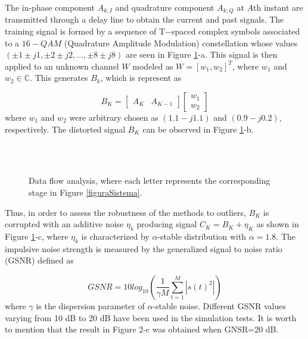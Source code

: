 \documentclass[preprint,12pt]{elsarticle}
\begin{document}
The in-phase component $A_{k;I}$ and quadrature component $A_{k;Q}$ at $A$th instant are transmitted through a delay line to obtain the current and past signals. The training signal is formed by a sequence of T$-$spaced complex symbols associated to a $16-QAM$ (Quadrature Amplitude Modulation) constellation whose values $(\pm 1 \pm j1, \pm 2 \pm j2, ... , \pm 8 \pm j8)$ are seen in Figure \ref{dataflow}-a. This signal is then applied to an unknown channel $W$ modeled as $W = [w_1,w_2]^T$, where $w_1$ and $w_2 \in \mathbb{C}$. This generates $B_k$, which is represent as

\begin{equation}
    B_{K} = \begin{bmatrix}
        A_K & A_{K-1}
     \end{bmatrix}
    \begin{bmatrix}
        w_1 \\
        w_2
    \end{bmatrix}
\end{equation}
where $w_1$ and $w_2$ were arbitrary chosen as $(1.1 - j1.1)$ and $(0.9 -j0.2)$, respectively. The distorted signal $B_K$ can be observed in Figure \ref{dataflow}-b.

\begin{figure}[H]
\centering
{} 
\\
\subfloat[$B_k$ when corrupted with alpha-stable noise $(C_k)$. Alpha = 1.8 and GSNR = 20dB.]{\texttt{[image: t4]}} 
\subfloat[Recovered signal after adaptive equalization using MCCC using kernel size $\sigma = 1$ $(D_k)$]{\texttt{[image: t5]}}\\
\caption{Data flow analysis, where each letter represents the corresponding stage in Figure \ref{figuraSistema}.} 
\label{dataflow} 
\end{figure}



Thus, in order to assess the robustness of the methods to outliers, $B_K$ is corrupted with an additive noise $\eta_k$ producing signal $C_K = B_K + \eta_K$ as shown in Figure \ref{dataflow}-c, where $\eta_k$ is characterized by $\alpha$-stable distribution with $\alpha=1.8$. The impulsive noise strength is measured by the generalized signal to noise ratio  (GSNR) \citep{medidagsnr} defined as

\begin{equation}
GSNR = 10log_{10}\left ( \frac{1}{\gamma M}\sum_{t=1}^{M}|s(t)^2| \right )
\end{equation}
where $\gamma$ is the dispersion parameter of $\alpha$-stable noise. Different GSNR values varying from 10 dB to 20 dB have been used in the simulation tests. It is worth to mention that the result in Figure 2-c was obtained when GNSR=20 dB.
\end{document}
